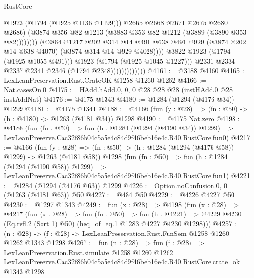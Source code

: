 \begin{lexlean}{RustCore}
\begin{coremodule}
                                                @1923
                                                (@1794 (@1925 @1136 @1199)))
                                              @2665
                                              @2668
                                              @2671
                                              @2675
                                              @2680
                                              @2686)
                                            (@3874
                                              @356
                                              @82
                                              @1213
                                              (@3883 @353 @82 @1212 (@3889 (@3890 @353 @82))))))))
                                    (@3864
                                      @1217
                                      @202
                                      @314
                                      @14
                                      @491
                                      @638
                                      @491
                                      @929
                                      (@3874 @202 @14 @638 @4070)
                                      (@3874 @314 @14 @929 @4028))))
                                @3822
                                @1923
                                (@1794 (@1925 @1055 @491)))
                              @1923
                              (@1794 (@1925 @1045 @1227)))
                            @2331
                            @2334
                            @2337
                            @2341
                            @2346
                            (@1794 @2348)))))))))))))
@4161 := @3188 @4160
@4165 := LexLeanPreservation.Rust.CrateOK @1258 @1260 @1262
@4166 := Nat.casesOn.{0}
@4175 := HAdd.hAdd.{0, 0, 0} @28 @28 @28 (instHAdd.{0} @28 instAddNat)
@4176 := @4175 @1343
@4180 := @1284 (@1294 (@4176 @34)) @1299
@4181 := @4175 @1341
@4188 := @4166 (fun (y : @28) => (fn : @50) -> (h : @4180) -> @1263 (@4181 @34)) @1298
@4190 := @4175 Nat.zero
@4198 := @4188
    (fun (fn : @50) =>
    fun (h : @1284 (@1294 (@4190 @34)) @1299) =>
    LexLeanPreserve.Cac32f86b04c5a5e4c84d9f46beb16e4c.R40.RustCore.fun0)
@4217 := @4166
    (fun (y : @28) => (fn : @50) -> (h : @1284 (@1294 (@4176 @58)) @1299) -> @1263 (@4181 @58))
    @1298
    (fun (fn : @50) =>
    fun (h : @1284 (@1294 (@4190 @58)) @1299) =>
    LexLeanPreserve.Cac32f86b04c5a5e4c84d9f46beb16e4c.R40.RustCore.fun1)
@4221 := @1284 (@1294 (@4176 @63)) @1299
@4226 := Option.noConfusion.{0, 0} (@1263 (@4181 @63)) @50
@4227 := @484 @50
@4229 := @4226 @4227 @50
@4230 := @1297 @1343
@4249 := fun (x : @28) =>
  @4198
    (fun (x : @28) =>
    @4217
      (fun (x : @28) =>
      fun (fn : @50) =>
      fun (h : @4221) =>
      @4229 @4230 (Eq.refl.{2} (Sort 1) @50) (heq_of_eq.{1} @1283 @4227 @4230 @1298)))
@4257 := (n : @28) -> (f : @28) -> LexLeanPreservation.Rust.FunSem @1258 @1260 @1262 @1343 @1298
@4267 := fun (n : @28) =>
  fun (f : @28) =>
  LexLeanPreservation.Rust.simulate
    @1258
    @1260
    @1262
    LexLeanPreserve.Cac32f86b04c5a5e4c84d9f46beb16e4c.R40.RustCore.crate_ok
    @1343
    @1298
\end{coremodule}
\end{lexlean}

